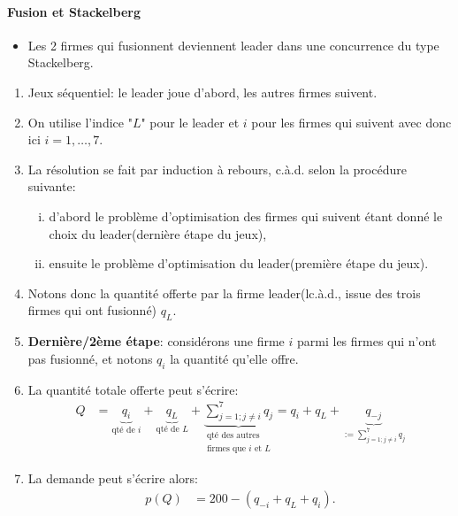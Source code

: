 \documentclass[notes, ignorenonframetext, compress, 10pt, xcolor=svgnames, aspectratio=169]{beamer}
\begin{document}
        \begin{frame}[allowframebreaks]{\insertsection}
            \framesubtitle{Fusion et Stackelberg}
            \begin{itemize}
        \item Les 2 firmes qui fusionnent deviennent leader dans une concurrence du type Stackelberg. 
             \end{itemize}
        \begin{enumerate}[$\star$]
            \item Jeux séquentiel: le leader joue d'abord, les autres firmes suivent. 
            \item On utilise l'indice "$L$" pour le leader et $i$ pour les firmes qui suivent avec donc 
            ici $i=1, \ldots, 7$.
            \item La résolution  se fait par induction à rebours, c.à.d. selon la procédure suivante:
            \begin{enumerate}[(i)]
            \item d'abord le problème d'optimisation des firmes qui suivent étant donné le choix du leader(dernière étape du jeux),
            \item ensuite le problème d'optimisation du leader(première étape du jeux).
            \end{enumerate}
            \item Notons donc la quantité offerte par la firme leader(lc.à.d., issue des trois firmes qui ont fusionné) $q_L$. 
            \item \textbf{Dernière/2ème étape}: considérons une firme $i$ parmi les firmes qui n'ont pas fusionné, 
            et notons $q_i$ la quantité qu'elle offre. 
            \item La quantité totale offerte peut s'écrire:
            \begin{align*}
                Q&= \underbrace{q_i}_{\text{qté de $i$}} + \underbrace{q_L}_{\text{qté de $L$}} 
                + \underbrace{\sum_{j=1; j\neq i}^7 q_j}_{\substack{\text{qté des autres}\\ \text{firmes que $i$ et $L$}}}
                 =  q_i + q_L + \underbrace{q_{-j}}_{:=\sum_{j=1; j\neq i}^7 q_j}
            \end{align*}
            \item La demande peut s'écrire alors:
            \begin{align*}
                p(Q) &= 200 - ( q_{-i} + q_L + q_i ).
            \end{align*}

\end{enumerate}
\end{frame}
\end{document}
